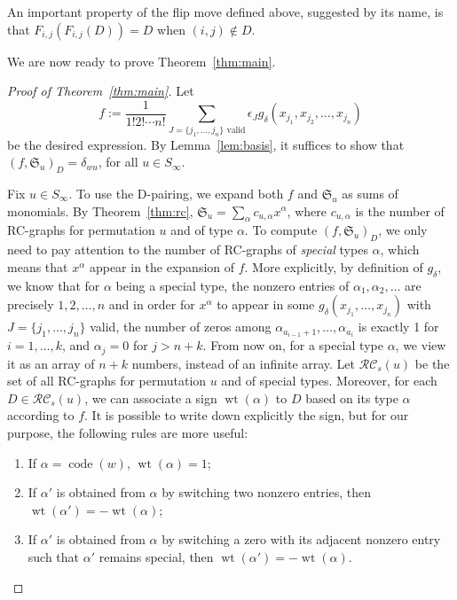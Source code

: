 \documentclass[ALCO,ThmDefs,Unicode,epreuves]{cedram}
\newcommand{\RC}{\mathcal{RC}}
\DeclareMathOperator{\wt}{wt}
\DeclareMathOperator{\code}{code}
\begin{document}
An important property of the flip move defined above, suggested by its name, is that $F_{i,j}(F_{i,j}(D))=D$ when $(i,j)\notin D$. 

We are now ready to prove Theorem~\ref{thm:main}.
\begin{proof}[Proof of Theorem~\ref{thm:main}]
Let 
\[
f:=\frac{1}{1!2!\cdots n!}\sum_{J=\{j_1,\ldots,j_n\}\text{ valid}}\epsilon_J g_{\delta}(x_{j_1},x_{j_2},\ldots,x_{j_n})
\]
be the desired expression. By Lemma~\ref{lem:basis}, it suffices to show that $(f,\mathfrak{S}_u)_D=\delta_{wu}$, for all $u\in S_{\infty}$.

Fix $u\in S_{\infty}$. To use the D-pairing, we expand both $f$ and $\mathfrak{S}_u$ as sums of monomials. By Theorem~\ref{thm:rc}, $\mathfrak{S}_u=\sum_{\alpha} c_{u,\alpha}x^{\alpha}$, where $c_{u,\alpha}$ is the number of RC-graphs for permutation $u$ and of type $\alpha$. To compute $(f,\mathfrak{S}_u)_D$, we only need to pay attention to the number of RC-graphs of \emph{special} types $\alpha$, which means that $x^{\alpha}$ appear in the expansion of $f$. More explicitly, by definition of $g_{\delta}$, we know that for $\alpha$ being a special type, the nonzero entries of $\alpha_1,\alpha_2,\ldots$ are precisely $1,2,\ldots,n$ and in order for $x^{\alpha}$ to appear in some $g_{\delta}(x_{j_1},\ldots,x_{j_n})$ with $J=\{j_1,\ldots,j_n\}$ valid, the number of zeros among $\alpha_{a_{i-1}+1},\ldots,\alpha_{a_i}$ is exactly 1 for $i=1,\ldots,k$, and $\alpha_j=0$ for $j>n+k$. From now on, for a special type $\alpha$, we view it as an array of $n+k$ numbers, instead of an infinite array. Let $\RC_s(u)$ be the set of all RC-graphs for permutation $u$ and of special types. Moreover, for each $D\in\RC_s(u)$, we can associate a sign $\wt(\alpha)$ to $D$ based on its type $\alpha$ according to $f$. It is possible to write down explicitly the sign, but for our purpose, the following rules are more useful:
\begin{enumerate}
\item\label{proof_theo2.2_prem1} If $\alpha=\code(w)$, $\wt(\alpha)=1$;
\item\label{proof_theo2.2_prem2} If $\alpha'$ is obtained from $\alpha$ by switching two nonzero entries, then $\wt(\alpha')=-\wt(\alpha)$;
\item\label{proof_theo2.2_prem3} If $\alpha'$ is obtained from $\alpha$ by switching a zero with its adjacent nonzero entry such that $\alpha'$ remains special, then $\wt(\alpha')=-\wt(\alpha)$.
\end{enumerate}

\end{proof}
\end{document}

